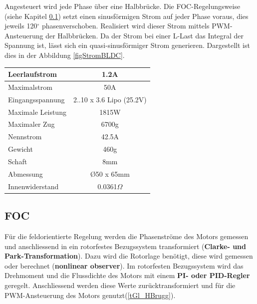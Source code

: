 Angesteuert wird jede Phase über eine Halbbrücke. Die FOC-Regelungsweise (siehe Kapitel \ref{tGl_FOC}) setzt einen sinusförmigen Strom auf jeder Phase voraus, dies jeweils 120\(^\circ\) phasenverschoben. Realisiert wird dieser Strom mittels PWM-Ansteuerung der Halbbrücken. Da der Strom bei einer L-Last das Integral der Spannung ist, lässt sich ein quasi-sinusförmiger Strom generieren. Dargestellt ist dies in der Abbildung \ref{figStromBLDC}.

\begin{center}
\begin{tabular}{l|c}
\hline 
\rule[-1ex]{0pt}{2.5ex} Leerlaufstrom & 1.2A \\ 
\hline 
\rule[-1ex]{0pt}{2.5ex} Maximalstrom & 50A \\ 
\hline
\rule[-1ex]{0pt}{2.5ex} Eingangsspannung & 2..10 x 3.6 Lipo (25.2V) \\ 
\hline
\rule[-1ex]{0pt}{2.5ex} Maximale Leistung & 1815W \\ 
\hline
\rule[-1ex]{0pt}{2.5ex} Maximaler Zug & 6700g \\ 
\hline
\rule[-1ex]{0pt}{2.5ex} Nennstrom & 42.5A \\ 
\hline
\rule[-1ex]{0pt}{2.5ex} Gewicht & 460g \\ 
\hline
\rule[-1ex]{0pt}{2.5ex} Schaft & 8mm \\ 
\hline
\rule[-1ex]{0pt}{2.5ex} Abmessung & \O 50 x 65mm \\ 
\hline
\rule[-1ex]{0pt}{2.5ex} Innenwiderstand & 0.0361$\Omega$ \\ 
\hline	
\end{tabular} 
\label{tabBLDCdaten}
\end{center}



\subsection{FOC}
\label{tGl_FOC}

Für die feldorientierte Regelung werden die Phasenströme des Motors gemessen und anschliessend in ein rotorfestes Bezugssystem transformiert (\textbf{Clarke- und Park-Transformation}). Dazu wird die Rotorlage benötigt, diese wird gemessen oder berechnet (\textbf{nonlinear observer}). Im rotorfesten Bezugssystem wird das Drehmoment und die Flussdichte des Motors mit einem \textbf{PI- oder PID-Regler} geregelt. Anschliessend werden diese Werte zurücktransformiert und für die PWM-Ansteuerung des Motors genutzt(\ref{tGl_HBrugg}). 

